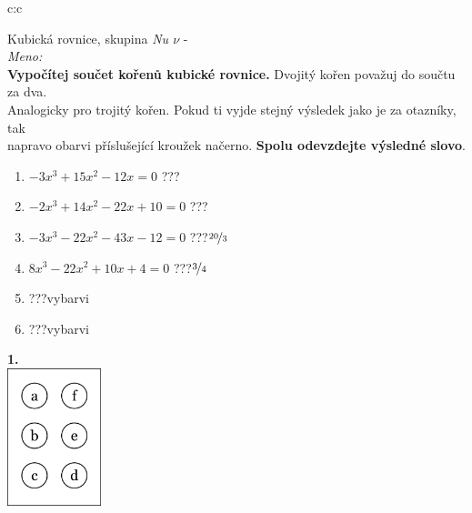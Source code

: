 \documentclass[10pt]{report}
\begin{document}
\begin{tabular}{c:c}
\begin{minipage}[c][99mm][t]{0.49\linewidth}
\begin{center}
\vspace{7mm}
{\huge Kubická rovnice, skupina \textit{Nu $\nu$} -}\\[4.5mm]
\textit{Meno:}\phantom{xxxxxxxxxxxxxxxxxxxxxxxxxxxxxxxxxxxxxxxxxxxxxxxxxxxxxxxxxxxxxxxxx}\\[3.5mm]
\textbf{Vypočítej součet kořenů kubické rovnice.} Dvojitý kořen považuj do součtu za dva.\\Analogicky pro trojitý kořen. Pokud ti vyjde stejný výsledek jako je za otazníky, tak\\napravo obarvi příslušející kroužek načerno. \textbf{Spolu odevzdejte výsledné slovo}.\\[3mm]
\begin{minipage}{0.77\linewidth}
\begin{center}
\begin{varwidth}{\textwidth}
\begin{enumerate}
\large
\item $-3x^3+15x^2-12x=0$\quad \dotfill\; ???\;\dotfill {}
\item $-2x^3+14x^2-22x+10=0$\quad \dotfill\; ???\;\dotfill {}
\item $-3x^3-22x^2-43x-12=0$\quad \dotfill\; ???\;\dotfill \quad $\nicefrac{20}{3}$
\item $8x^3-22x^2+10x+4=0$\quad \dotfill\; ???\;\dotfill \quad $\nicefrac{3}{4}$
\item \quad \dotfill\; ???\;\dotfill \quad vybarvi
\item \quad \dotfill\; ???\;\dotfill \quad vybarvi
\end{enumerate}
\end{varwidth}
\end{center}
\end{minipage}
\begin{minipage}{0.20\linewidth}
\begin{center}
{\Huge\bfseries 1.} \\[2mm]
\includegraphics[height=40mm]{../images/braille.png}

\end{center}
\end{minipage}
\end{center}
\end{minipage}
\end{tabular}
\end{document}
